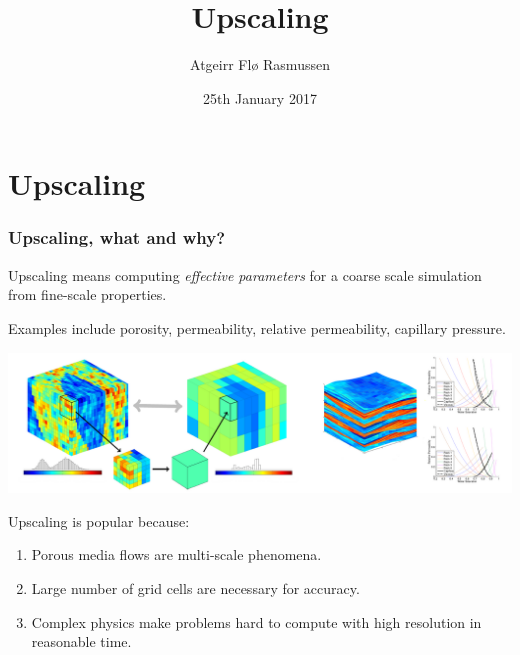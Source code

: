 \documentclass[UKenglish,10pt]{beamer}
\title{Upscaling}
\author[Atgeirr F. Rasmussen]{Atgeirr Fl{\o} Rasmussen}
\institute[SINTEF]{SINTEF ICT, Dept. Applied Mathematics}
\date[2017--01--25]{25th January 2017}
\begin{document}
\section{Upscaling}



\begin{frame}
  \frametitle{Upscaling, what and why?}

  Upscaling means computing \emph{effective parameters} for a coarse
  scale simulation from fine-scale properties.
  \bigskip

  Examples include porosity, permeability, relative permeability,
  capillary pressure.
  \bigskip

  \includegraphics[width=\textwidth]{figs/OPM-upscaling.png}

  Upscaling is popular because:
  \begin{enumerate}
  \item Porous media flows are multi-scale phenomena.
  \item Large number of grid cells are necessary for accuracy.
  \item Complex physics make problems hard to compute with high
    resolution in reasonable time.
  \end{enumerate}
\end{frame}






\end{document}
